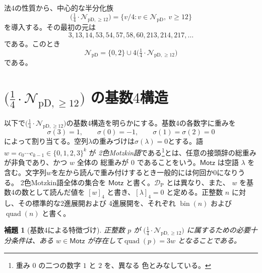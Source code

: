 \documentclass[12pt]{ltjsarticle}
\theoremstyle{plain}
\newtheorem{lemma}[theorem]{補題}
\theoremstyle{definition}
\theoremstyle{plain}
\newcommand{\NpD}{\mathcal{N}_{\mathrm{pD}}}
\newcommand{\DP}{\mathcal{D}_{\mathrm{P}}}
\newcommand{\Pset}{%
  \bigl(\tfrac{1}{4}\cdot\mathcal{N}_{\mathrm{pD},\geq 12}\bigr)%
}
\begin{document}
法4の性質から、中心的な半分化族
\begin{equation}\label{eq:P-def}
 \Pset=\{v/4:v\in\NpD,\ v\geq12\}
\end{equation}
を導入する。その最初の元は
\[
 3,13,14,53,54,57,58,60,213,214,217,\ldots
\]
である。このとき
\begin{equation}\label{eq:NpD-decomp}
 \NpD=\{0,2\}\cup4\Pset
\end{equation}
である。

\section{\texorpdfstring{$\Pset$}{P} の基数\texorpdfstring{$4$}{4}構造}
\label{sec:base4}

以下で$\Pset$の基数4構造を明らかにする。基数4の各数字に重みを
\[
  \sigma(3)=1,\qquad \sigma(0)=-1,\qquad
  \sigma(1)=\sigma(2)=0
\]
によって割り当てる。空列$\lambda$の重みづけは$\sigma(\lambda)=0$とする。語 $w=c_0\cdots c_{k-1}\in\{0,1,2,3\}^{k}$ が
\emph{2色Motzkin語}である\footnote{重み $0$ の二つの数字 $1$ と $2$ を、異なる
色とみなしている。}とは、任意の接頭辞の総重みが非負であり、かつ $w$ 全体の
総重みが $0$ であることをいう。$\mathsf{Motz}$ は空語 $\lambda$ を含む。文字列$w$を左から読んで重み付けするとき一般的には何回か$0$になりうる。
2色Motzkin語全体の集合を $\mathsf{Motz}$ と書く。$\DP$ とは異なり、また、
$w$ を基数4の数として読んだ値を $[w]_4$
と書き、$[\lambda]_4=0$ と定める。正整数 $n$ に対し、その標準的な2進展開および
4進展開を、それぞれ $\operatorname{bin}(n)$ および $\operatorname{quad}(n)$ と書く。

\begin{lemma}[基数4による特徴づけ]\label{lem:base4}
正整数 $p$ が $\Pset$ に属するための必要十分条件は、ある $w\in\mathsf{Motz}$ が存在して$ \operatorname{quad}(p)=3w$
となることである。
\end{lemma}
\end{document}
